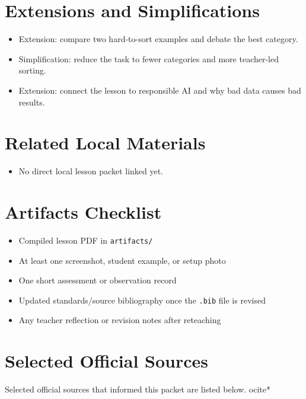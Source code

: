 \documentclass[11pt]{article}
\begin{document}
\section*{Extensions and Simplifications}
\begin{itemize}[leftmargin=*]
\item Extension: compare two hard-to-sort examples and debate the best category.
\item Simplification: reduce the task to fewer categories and more teacher-led sorting.
\item Extension: connect the lesson to responsible AI and why bad data causes bad results.
\end{itemize}

\section*{Related Local Materials}
\begin{itemize}[leftmargin=*]
\item No direct local lesson packet linked yet.
\end{itemize}

\section*{Artifacts Checklist}
\begin{itemize}[leftmargin=*]
\item Compiled lesson PDF in \texttt{artifacts/}
\item At least one screenshot, student example, or setup photo
\item One short assessment or observation record
\item Updated standards/source bibliography once the \texttt{.bib} file is revised
\item Any teacher reflection or revision notes after reteaching
\end{itemize}

\section*{Selected Official Sources}
Selected official sources that informed this packet are listed below.
ocite{*}



\end{document}
